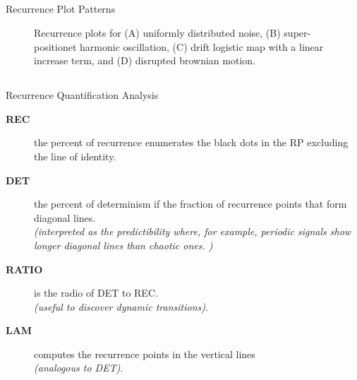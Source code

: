 \subsection{}
{

\begin{frame}{Recurrence Plot Patterns}
    \begin{figure}
	\caption{Recurrence plots for (A) uniformly distributed noise,
		(B) super-positionet harmonic oscillation,
		(C) drift logistic map with a linear increase term, and
		(D) disrupted brownian motion.
		} 
   \end{figure}
	
\end{frame}
}



\subsection{}
{

\begin{frame}{Recurrence Quantification Analysis}

\begin{description}
\item [ \textbf{REC} ] the percent of recurrence enumerates 
			the black dots in the RP excluding the line of identity.
\item [ \textbf{DET} ] the percent of determinism if the fraction of recurrence points
			that form diagonal lines. \\
			\textit{(interpreted as the predictibility where, for example,
				periodic signals show longer diagonal lines 
				than chaotic ones.
				)}
\item [ \textbf{RATIO} ] is the radio of DET to REC. \\
			\textit{(useful to discover dynamic transitions)}.
\item [ \textbf{LAM} ] computes the recurrence points in the vertical lines \\
			\textit{(analogous to DET)}.
\end{description}


	
\end{frame}
}






